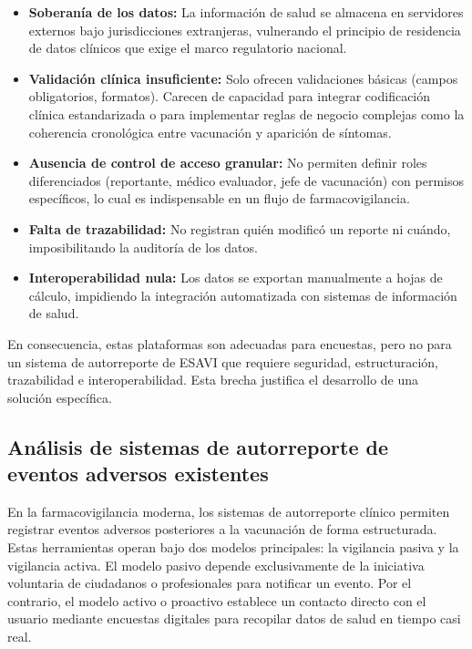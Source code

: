 \begin{itemize}

\item \textbf{Soberanía de los datos:} La información de salud se almacena en servidores externos bajo jurisdicciones extranjeras, vulnerando el principio de residencia de datos clínicos que exige el marco regulatorio nacional.

\item \textbf{Validación clínica insuficiente:} Solo ofrecen validaciones básicas (campos obligatorios, formatos). Carecen de capacidad para integrar codificación clínica estandarizada o para implementar reglas de negocio complejas como la coherencia cronológica entre vacunación y aparición de síntomas.

\item \textbf{Ausencia de control de acceso granular:} No permiten definir roles diferenciados (reportante, médico evaluador, jefe de vacunación) con permisos específicos, lo cual es indispensable en un flujo de farmacovigilancia.

\item \textbf{Falta de trazabilidad:} No registran quién modificó un reporte ni cuándo, imposibilitando la auditoría de los datos.

\item \textbf{Interoperabilidad nula:} Los datos se exportan manualmente a hojas de cálculo, impidiendo la integración automatizada con sistemas de información de salud.

\end{itemize}

En consecuencia, estas plataformas son adecuadas para encuestas, pero no para un sistema de autorreporte de ESAVI que requiere seguridad, estructuración, trazabilidad e interoperabilidad. Esta brecha justifica el desarrollo de una solución específica.

\subsection{Análisis de sistemas de autorreporte de eventos adversos existentes}

En la farmacovigilancia moderna, los sistemas de autorreporte clínico permiten registrar eventos adversos posteriores a la vacunación de forma estructurada. 
Estas herramientas operan bajo dos modelos principales: la vigilancia pasiva y la vigilancia activa. El modelo pasivo depende exclusivamente de la iniciativa voluntaria de ciudadanos o profesionales para notificar un evento.
Por el contrario, el modelo activo o proactivo establece un contacto directo con el usuario mediante encuestas digitales para recopilar datos de salud en tiempo casi real.

